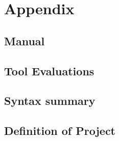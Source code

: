 
\appendix
\part{Appendix}

\chapter{Manual}

\chapter{Tool Evaluations}

\chapter{Syntax summary}

\chapter{Definition of Project}
\begin{figure}[H]
\centering
\setlength\fboxsep{0pt}
\setlength\fboxrule{0.5pt}
\end{figure}

